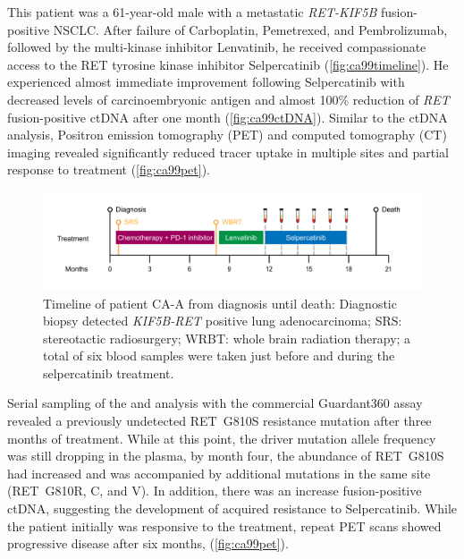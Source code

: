 This patient was a 61-year-old male  with a metastatic \textit{RET-KIF5B} fusion-positive NSCLC. After  failure of Carboplatin, Pemetrexed, and Pembrolizumab, followed by the multi-kinase inhibitor Lenvatinib, he  received compassionate access to the RET tyrosine kinase inhibitor Selpercatinib (\autoref{fig:ca99timeline}). He experienced almost immediate improvement following Selpercatinib with decreased levels of carcinoembryonic antigen and almost 100\% reduction of \textit{RET} fusion-positive ctDNA after one month (\autoref{fig:ca99ctDNA}). Similar to the ctDNA analysis, Positron emission tomography (PET) and computed tomography (CT) imaging revealed significantly reduced tracer uptake in multiple sites and partial response to treatment (\autoref{fig:ca99pet}).

\begin{figure}[ht]
\centering
\includegraphics[width=.99\linewidth]{Figures/CASCADE/CA99/CA-A_timeline}
\caption[Timeline of patient CA-A from diagnosis until death]{Timeline of patient CA-A from diagnosis until death: Diagnostic biopsy detected \textit{KIF5B-RET} positive lung adenocarcinoma; SRS: stereotactic radiosurgery; WRBT: whole brain radiation therapy; a total of six blood samples were taken just before and during the selpercatinib treatment.} \label{fig:ca99timeline}
\end{figure}


Serial sampling of the  and analysis with the commercial Guardant360 assay \cite{Talasaz2014} revealed a previously undetected RET~G810S resistance mutation after three months of treatment. While at this point, the driver mutation allele frequency was still dropping in the plasma, by month four, the abundance of RET~G810S had increased and was accompanied by additional mutations in the same site (RET~G810R, C, and V). In addition, there was an increase  fusion-positive ctDNA,  suggesting the development of acquired resistance to Selpercatinib. While the patient initially was responsive to the treatment, repeat PET scans showed progressive disease after six months,  (\autoref{fig:ca99pet}).

